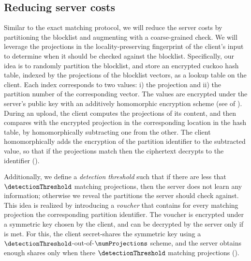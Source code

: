 

\subsection{Reducing server costs}
%
Similar to the exact matching protocol, we will reduce the server costs by partitioning the blocklist and augmenting with a coarse-grained check. 
We will leverage the projections in the locality-preserving fingerprint of the client's input to determine when it should be checked against the blocklist. 
Specifically,  our idea is to randomly partition the blocklist, and store an encrypted cuckoo hash table, indexed by the projections of the blocklist vectors, as a lookup table on the client. Each index corresponds to two values: i) the projection and ii) the partition number of the corresponding vector. The values are encrypted under the server's public key with an additively homomorphic encryption scheme (see  of \protocolFMP). During an upload, the client computes the projections of its content, and then compares with the encrypted projection in the corresponding location in the hash table, by homomorphically subtracting one from the other. The client homomorphically adds the encryption of the partition identifier to the subtracted value, so that if the projections match then the ciphertext decrypts to the identifier (). 




Additionally, we define a \emph{detection threshold} \detectionThreshold such that if there are less that $\detectionThreshold$ matching projections, then the server does not learn any information; otherwise we reveal the partitions the server should check against. This idea is realized  by introducing a \emph{voucher} that contains for every matching projection the corresponding partition identifier. The voucher is encrypted under a symmetric key chosen by the client, and can be decrypted by the server only if \detectionThreshold is met. For this, the client secret-shares the symmetric key using a $\detectionThreshold$-out-of-$\numProjections$ scheme, and the server obtains enough shares only when there $\detectionThreshold$ matching projections (). 


